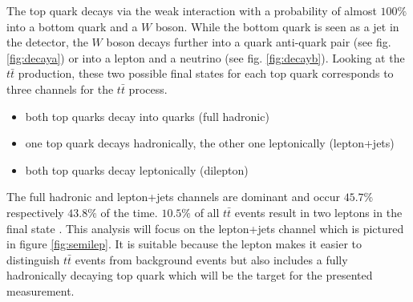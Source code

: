 	The top quark decays via the weak interaction with a probability of almost $100\%$ into a bottom quark and a $W$ boson. While the bottom quark is seen as a jet in the detector, the $W$ boson decays further into a quark anti-quark pair (see fig. \ref{fig:decaya}) or into a lepton and a neutrino (see fig. \ref{fig:decayb}). Looking at the $t\bar{t}$ production, these two possible final states for each top quark corresponds to three channels for the $t\bar{t}$ process. 
	\begin{itemize}
	\item both top quarks decay into quarks (full hadronic)
	\item one top quark decays hadronically, the other one leptonically (lepton+jets)
	\item both top quarks decay leptonically (dilepton)
	\end{itemize}
	The full hadronic and lepton+jets channels are dominant and occur $45.7\%$ respectively $43.8\%$ of the time. $10.5\%$ of all $t\bar{t}$ events result in two leptons in the final state \cite{pdg2016}. This analysis will focus on the lepton+jets channel which is pictured in figure \ref{fig:semilep}. It is suitable because the lepton makes it easier to distinguish $t\bar{t}$ events from background events but also includes a fully hadronically decaying top quark which will be the target for the presented measurement.
	
